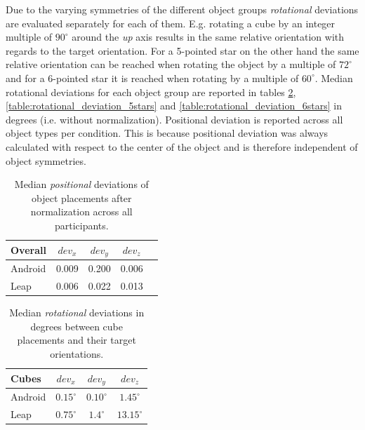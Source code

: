 Due to the varying symmetries of the different object groups \textit{rotational} deviations are evaluated separately for each of them.
E.g. rotating a cube by an integer multiple of $90^{\circ}$ around the \textit{up} axis results in the same relative orientation with regards to the target orientation.
For a 5-pointed star on the other hand the same relative orientation can be reached when rotating the object by a multiple of $72^{\circ}$ and for a 6-pointed star it is reached when rotating by a multiple of $60^{\circ}$.
Median rotational deviations for each object group are reported in tables
\ref{table:rotational_deviation_cubes}, \ref{table:rotational_deviation_5stars} and \ref{table:rotational_deviation_6stars} in degrees (i.e. without normalization).
Positional deviation is reported across all object types per condition.
This is because positional deviation was always calculated with respect to the center of the object and is therefore independent of object symmetries.



\begin{table}[htbp]
    \centering
    \begin{tabular}{|l|c c c|r|}
        \hline
        \textbf{Overall}	&	$dev_x$	&	$dev_y$	&	$dev_z$	\\ \hline
        Android	&	0.009	&	0.200	&	0.006	\\ \hline
        Leap	&	0.006	&	0.022	&	0.013	\\ \hline
    \end{tabular}
    \caption{
    \textsf{Median \textit{positional} deviations of object placements after normalization across all participants.}
    }
    \label{table:positional_deviation}
\end{table}

\begin{table}[htbp]
    \centering
    \begin{tabular}{|l|c c c|}
        \hline
        \textbf{Cubes}	&	$dev_x$	&	$dev_y$	&	$dev_z$	\\ \hline
        Android	&	$0.15^{\circ}$	&	$0.10^{\circ}$	&	$1.45^{\circ}$	\\ \hline
        Leap	&	$0.75^{\circ}$	&	$1.4^{\circ}$	&	$13.15^{\circ}$	\\ \hline
    \end{tabular}
    \caption{
    \textsf{Median \textit{rotational} deviations in degrees between cube placements and their target orientations.}
    }
    \label{table:rotational_deviation_cubes}
\end{table}

